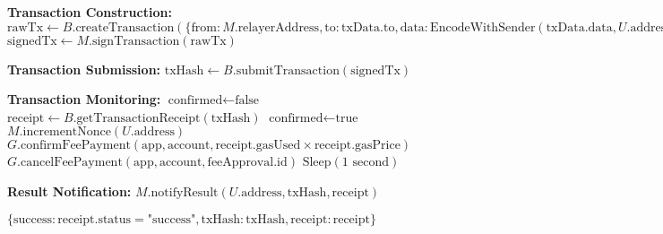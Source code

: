 \begin{protocol}
\begin{algorithmic}[1]
\State \textbf{Transaction Construction:}
\State $\text{rawTx} \gets B.\text{createTransaction}(\{\text{from}: M.\text{relayerAddress}, \text{to}: \text{txData}.\text{to}, \text{data}: \text{EncodeWithSender}(\text{txData}.\text{data}, U.\text{address}), \text{value}: \text{txData}.\text{value}, \text{gasLimit}: \text{gasLimit}, \text{gasPrice}: \text{gasPrice}\})$
\State $\text{signedTx} \gets M.\text{signTransaction}(\text{rawTx})$

\State \textbf{Transaction Submission:}
\State $\text{txHash} \gets B.\text{submitTransaction}(\text{signedTx})$

\State \textbf{Transaction Monitoring:}
\State $\text{confirmed} \gets \text{false}$
    \State $\text{receipt} \gets B.\text{getTransactionReceipt}(\text{txHash})$
        \State $\text{confirmed} \gets \text{true}$
            \State $M.\text{incrementNonce}(U.\text{address})$
            \State $G.\text{confirmFeePayment}(\text{app}, \text{account}, \text{receipt}.\text{gasUsed} \times \text{receipt}.\text{gasPrice})$
        \Else
            \State $G.\text{cancelFeePayment}(\text{app}, \text{account}, \text{feeApproval}.\text{id})$
        \EndIf
    \EndIf
        \State $\text{Sleep}(1\text{ second})$
    \EndIf
\EndWhile

\State \textbf{Result Notification:}
\State $M.\text{notifyResult}(U.\text{address}, \text{txHash}, \text{receipt})$

\State \Return $\{\text{success}: \text{receipt}.\text{status} = \text{"success"}, \text{txHash}: \text{txHash}, \text{receipt}: \text{receipt}\}$
\end{algorithmic}
\end{protocol}

